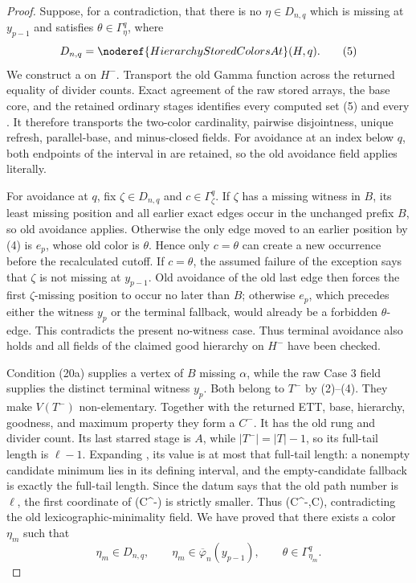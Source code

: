 \begin{proof}
Suppose, for a contradiction, that there is no \(\eta\in D_{n,q}\)
which is missing at \(y_{p-1}\) and satisfies
\(\theta\in\Gamma^q_\eta\), where
\[
 D_{n,q}=\noderef{HierarchyStoredColorsAt}(H,q).
                                                               \tag{5}
\]
We construct a  on \(H^-\).  Transport the old
Gamma function across the returned equality of divider counts.  Exact
agreement of the raw stored arrays, the base core, and the retained
ordinary stages identifies every computed set (5) and every
.  It therefore transports the
two-color cardinality, pairwise disjointness, unique refresh,
parallel-base, and minus-closed fields.  For avoidance at an index below
\(q\), both endpoints of the interval in
 are retained, so the old avoidance field
applies literally.

For avoidance at \(q\), fix \(\zeta\in D_{n,q}\) and
\(c\in\Gamma^q_\zeta\).  If \(\zeta\) has a missing witness in \(B\),
its least missing position and all earlier exact edges occur in the
unchanged prefix \(B\), so old avoidance applies.  Otherwise the only
edge moved to an earlier position by (4) is \(e_p\), whose old color is
\(\theta\).  Hence only \(c=\theta\) can create a new occurrence before
the recalculated cutoff.  If \(c=\theta\), the assumed failure of the
exception says that \(\zeta\) is not missing at \(y_{p-1}\).  Old
avoidance of the old last edge then forces the first \(\zeta\)-missing
position to occur no later than \(B\); otherwise \(e_p\), which precedes
either the witness \(y_p\) or the terminal fallback, would already be a
forbidden \(\theta\)-edge.  This contradicts the present no-witness
case.  Thus terminal avoidance also holds and all fields of the claimed
good hierarchy on \(H^-\) have been checked.

Condition (20a) supplies a vertex of \(B\) missing \(\alpha\), while the
raw Case 3 field supplies the distinct terminal witness \(y_p\).  Both
belong to \(T^-\) by (2)--(4).  They make \(V(T^-)\) non-elementary.
Together with the returned ETT, base, hierarchy, goodness, and maximum
property they form a  \(C^-\).  It has
the old rung and divider count.  Its last starred stage is \(A\), while
\(|T^-|=|T|-1\), so its full-tail length is \(\ell-1\).  Expanding
, its value is at most that full-tail
length: a nonempty candidate minimum lies in its defining interval, and
the empty-candidate fallback is exactly the full-tail length.  Since the
datum says that the old path number is \(\ell\), the first coordinate of
(C^-)\) is strictly smaller.
Thus (C^-,C)\), contradicting the
old lexicographic-minimality field.  We have proved that there exists a
color \(\eta_m\) such that
\[
 \eta_m\in D_{n,q},\qquad
 \eta_m\in\overline\varphi_n(y_{p-1}),\qquad
 \theta\in\Gamma^q_{\eta_m}.                                \tag{6}
\]


\end{proof}
